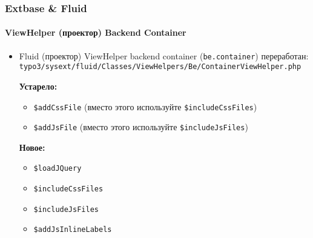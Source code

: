 
\begin{frame}[fragile]
	\frametitle{Extbase \& Fluid}
	\framesubtitle{ViewHelper (проектор) Backend Container}

	\lstset{
		basicstyle=\smaller\ttfamily
	}

	\begin{itemize}
		\item Fluid (проектор) ViewHelper backend container (\texttt{be.container}) переработан:\newline
			\smaller\texttt{typo3/sysext/fluid/Classes/ViewHelpers/Be/ContainerViewHelper.php}\normalsize\newline

			\smaller\textbf{Устарело:}\normalsize
			\begin{itemize}
				\item \texttt{\$addCssFile} (вместо этого используйте \texttt{\$includeCssFiles})
				\item \texttt{\$addJsFile} (вместо этого используйте \texttt{\$includeJsFiles})
			\end{itemize}

			\smaller\textbf{Новое:}\normalsize
			\begin{itemize}
				\item \texttt{\$loadJQuery}
				\item \texttt{\$includeCssFiles}
				\item \texttt{\$includeJsFiles}
				\item \texttt{\$addJsInlineLabels}
			\end{itemize}

	\end{itemize}

\end{frame}


